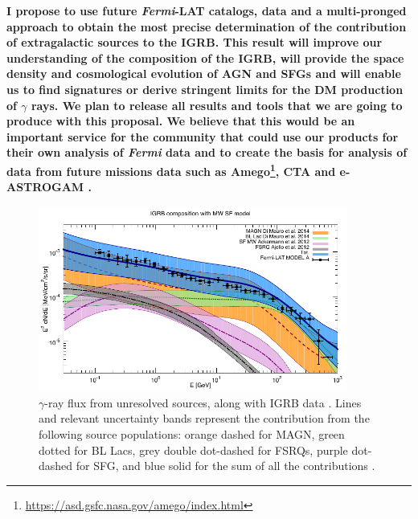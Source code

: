 \documentclass[12 pt]{article}
\begin{document}
{\bf I propose to use future {\it Fermi}-LAT catalogs, data and a multi-pronged approach to obtain the most precise determination of the contribution of extragalactic sources to the IGRB.  This result will improve our understanding of the composition of the IGRB, will provide the space density and cosmological evolution of AGN and SFGs and will enable us to find signatures or derive stringent limits for the DM production of $\gamma$ rays.
We plan to release all results and tools that we are going to produce with this proposal. 
We believe that this would be an important service for the community that could use our products for their own analysis of {\it Fermi} data and to create the basis for analysis of data from future missions data such as Amego\footnote{\url{https://asd.gsfc.nasa.gov/amego/index.html}}, CTA \cite{Ong:2017ihp} and e-ASTROGAM \cite{Tatischeff:2016ykb}.}


\begin{figure} %
   \centering
  \includegraphics[width=4.0in]{fluxcompart_2014_unr.pdf} 
   \caption{$\gamma$-ray flux from unresolved sources, along with IGRB data \cite{Ackermann:2014usa}. Lines and relevant uncertainty bands represent the contribution from the following source populations: orange dashed for MAGN,  green dotted for BL Lacs, grey double dot-dashed for FSRQs, purple dot-dashed for SFG, and blue solid for the sum of all the contributions \cite{DiMauro:2015tfa}.}
   \label{fig:igrbcomp}
\end{figure}
\end{document}

